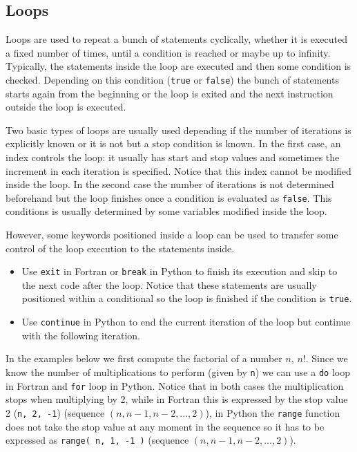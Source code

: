         \newpage
        \subsection{Loops}

Loops are used to repeat a bunch of statements cyclically, whether it is executed 
a fixed number of times, 
until a condition is reached or 
maybe up to infinity. 
Typically, the statements inside the loop are executed and then some condition is checked.
Depending on this condition (\texttt{true} or \texttt{false}) the bunch of statements starts again from the beginning or
the loop is exited and the next instruction outside the loop is executed. 

Two basic types of loops are usually used depending 
if the number of iterations is explicitly known or 
it is not but a stop condition is known. 
In the first case, an index controls the loop: it usually has start and stop values and sometimes the increment in each iteration is specified.
Notice that this index cannot be modified inside the loop.
In the second case the number of iterations is not determined beforehand but 
the loop finishes once a condition is evaluated as \texttt{false}. 
This conditions is usually determined by some variables modified inside the loop.

However, some keywords positioned inside a loop can be used to transfer 
some control of the loop execution to the statements inside. 
\begin{itemize}
    \item Use \texttt{exit} in Fortran or \texttt{break} in Python to finish its execution and skip to the next code after the loop. 
    Notice that these statements are usually positioned within a conditional so the loop is finished if the condition is \texttt{true}.        
    \item Use \texttt{continue} in Python to end the current iteration of the loop but continue with the following iteration. 
\end{itemize}

In the examples below we first compute the factorial of a number $n$, $n!$.
Since we know the number of multiplications to perform (given by \texttt{n}) we can use a 
\texttt{do} loop in Fortran and 
\texttt{for} loop in Python.
Notice that in both cases the multiplication stops when multiplying by 2, 
while in Fortran this is expressed by the stop value 2 (\texttt{n, 2, -1}) (sequence $(n, n-1, n-2,...,2)$), 
in Python the \texttt{range} function does not take the stop value at any moment in the sequence
so it has to be expressed as \texttt{range( n, 1, -1 )} (sequence $(n, n-1, n-2,..., 2)$).

